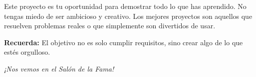 \documentclass[12pt,a4paper]{article}
\begin{document}
\vspace{1cm}

\begin{tcolorbox}[colback=nablue!5!white,colframe=nablue,title=\textbf{¡Mucho Éxito!}]
Este proyecto es tu oportunidad para demostrar todo lo que has aprendido. No tengas miedo de ser ambicioso y creativo. Los mejores proyectos son aquellos que resuelven problemas reales o que simplemente son divertidos de usar.

\vspace{0.5em}
\textbf{Recuerda:} El objetivo no es solo cumplir requisitos, sino crear algo de lo que estés orgulloso.

\vspace{0.5em}
\centering
\textit{¡Nos vemos en el Salón de la Fama!}
\end{tcolorbox}
\end{document}

